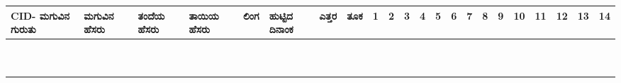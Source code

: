 ﻿\documentclass[12pt]{article}
\newcommand{\kn}[1]{%
{\fontspec[Script=Kannada]{Kedage}%
#1
}}
\begin{document}
\begin{tabular}{|l|p{2.8cm}|p{2.8cm}|p{2.8cm}|p{1cm}|p{1cm}|l|l|l|l|l|l|l|l|l|l|l|l|l|l|l|l|}
CID-\kn{ಮಗುವಿನ ಗುರುತು} & \kn{ಮಗುವಿನ ಹೆಸರು} & \kn{ತಂದೆಯ ಹೆಸರು} & \kn{ತಾಯಿಯ ಹೆಸರು} & \kn{ಲಿಂಗ} & \kn{ಹುಟ್ಟಿದ ದಿನಾಂಕ} & \kn{ಎತ್ತರ} & \kn{ತೂಕ} & 1 & 2 & 3 & 4 & 5 & 6 & 7 & 8 & 9 & 10 & 11 & 12 & 13 & 14\\ \hline
 &  &  &  &  &  & & & & & & & & & & & & & & & &  \\ \hline
 &  &  &  &  &  & & & & & & & & & & & & & & & &  \\ \hline
 &  &  &  &  &  & & & & & & & & & & & & & & & &  \\ \hline
 &  &  &  &  &  & & & & & & & & & & & & & & & &  \\ \hline
 &  &  &  &  &  & & & & & & & & & & & & & & & &  \\ \hline
 &  &  &  &  &  & & & & & & & & & & & & & & & &  \\ \hline
 &  &  &  &  &  & & & & & & & & & & & & & & & &  \\ \hline
 &  &  &  &  &  & & & & & & & & & & & & & & & &  \\ \hline
 &  &  &  &  &  & & & & & & & & & & & & & & & &  \\ \hline
 &  &  &  &  &  & & & & & & & & & & & & & & & &  \\ \hline

\end{tabular}

\pagebreak

\end{document}
